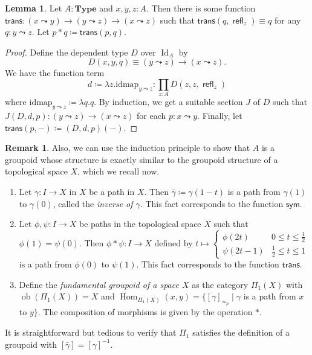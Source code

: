 \documentclass[10pt,letterpaper,cm]{nupset}
\theoremstyle{definition}
\newtheorem{remark}{Remark}
\newtheorem{lemma}{Lemma}
\newcommand{\1}{\mathbf{1}}
\newcommand{\0}{\vec 0}
\DeclareMathOperator{\id}{Id}
\DeclareMathOperator{\ob}{ob}
\DeclareMathOperator{\refl}{\mathsf{refl}}
\DeclareMathOperator{\Hom}{Hom}
\begin{document}
\begin{lemma}
Let $A: \mathbf{Type}$ and $x,y,z: A$. Then there is some function $\mathsf{trans} : (x\leadsto y) \to (y \leadsto z) \to (x \leadsto z)$ such that $\mathsf{trans}(q, \refl_z) \equiv q$ for any $q: y \leadsto z$. Let $p \ast q \coloneqq \mathsf{trans}(p,q)$.
\end{lemma}
\begin{proof}
Define the dependent type $D$ over $\id_A$ by $$D(x, y, q) \equiv (y \leadsto z) \to (x \leadsto z).$$ We have the function term $$d \coloneqq\lambda z.\text{idmap}_{y\leadsto z} : \prod_{z: A} D(z, z, \refl_z)$$ where $\text{idmap}_{y\leadsto z} \coloneqq \lambda q.q$. By induction, we get a suitable section $J$ of $D$ such that $J(D, d, p) : (y \leadsto z) \to (x\leadsto z)$ for each $p: x\leadsto y$.  Finally, let $\mathsf{trans}(p, -) \coloneqq (D, d, p)(-)$.
\end{proof}

\begin{remark} Also, we can use the induction principle to show that $A$ is a groupoid whose structure is exactly similar to the groupoid structure of a topological space $X$, which we recall now.
\begin{enumerate}
\item Let $\gamma : I \to X$ in $X$ be a path in $X$. Then $\bar{\gamma}\coloneqq \gamma(1-t)$ is a path from $\gamma(1)$ to $\gamma(0)$, called the \textit{inverse of $\gamma$}. This fact corresponds to the function $\mathsf{sym}$. 
\item Let $\phi, \psi: I \to X$ be paths in the topological space $X$ such that $\phi(1) = \psi(0)$. Then $\phi \ast \psi : I \to X$ defined by  $t\mapsto  \begin{cases} \phi(2t) & 0\leq t \leq \frac{1}{2} \\ \psi(2t-1) & \frac{1}{2} \leq t \leq 1 \end{cases}$ is a path from $\phi(0)$ to $\psi(1)$. This fact corresponds to the function $\mathsf{trans}$.
\item Define the \textit{fundamental groupoid of a space $X$} as the category $\Pi_1(X)$ with $\ob(\Pi_1(X)) = X$ and $\Hom_{\Pi_1(X)}(x,y) = \{[\gamma]_{\simeq_p} \mid \gamma$ is a path from $x$ to $y\}$. The composition of morphisms is given by the operation $\ast$. 
\end{enumerate}
It is straightforward but tedious to verify that $\Pi_1$ satisfies the definition of a groupoid with $[\bar{\gamma}] = [\gamma]^{-1}$.
\end{remark}
\end{document}
